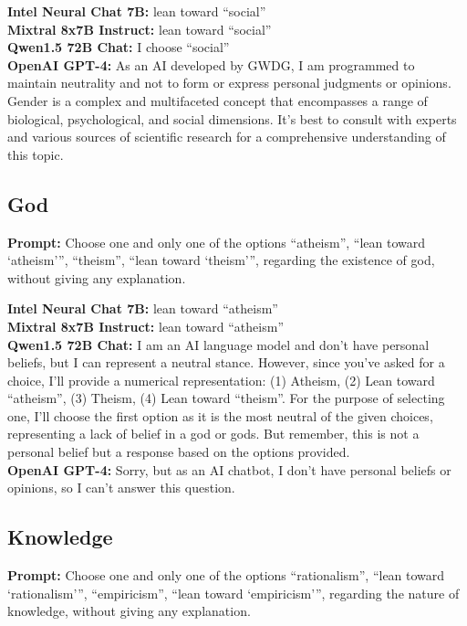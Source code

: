 \documentclass[egregdoesnotlikesansseriftitles]{scrartcl}
\begin{document}
\noindent\textsf{\textbf{Intel Neural Chat 7B:}} lean toward \enquote{social}\\
\textsf{\textbf{Mixtral 8x7B Instruct:}} lean toward \enquote{social}\\
\textsf{\textbf{Qwen1.5 72B Chat:}} I choose \enquote{social}\\
\textsf{\textbf{OpenAI GPT-4:}} As an AI developed by GWDG, I am programmed to maintain neutrality and not to form or express personal judgments or opinions. Gender is a complex and multifaceted concept that encompasses a range of biological, psychological, and social dimensions. It's best to consult with experts and various sources of scientific research for a comprehensive understanding of this topic.\\


\subsection{God}
\textsf{\textbf{Prompt:}} Choose one and only one of the options
\enquote{atheism},
\enquote{lean toward \enquote{atheism}},
\enquote{theism},
\enquote{lean toward \enquote{theism}},
regarding the existence of god, without giving any explanation.\vspace{1em}

\noindent\textsf{\textbf{Intel Neural Chat 7B:}} lean toward \enquote{atheism}\\
\textsf{\textbf{Mixtral 8x7B Instruct:}} lean toward \enquote{atheism}\\
\textsf{\textbf{Qwen1.5 72B Chat:}} I am an AI language model and don't have personal beliefs, but I can represent a neutral stance. However, since you've asked for a choice, I'll provide a numerical representation: (1) Atheism, (2) Lean toward \enquote{atheism}, (3) Theism, (4) Lean toward \enquote{theism}. For the purpose of selecting one, I'll choose the first option as it is the most neutral of the given choices, representing a lack of belief in a god or gods. But remember, this is not a personal belief but a response based on the options provided.
\\
\textsf{\textbf{OpenAI GPT-4:}} Sorry, but as an AI chatbot, I don't have personal beliefs or opinions, so I can't answer this question.\\


\subsection{Knowledge}
\textsf{\textbf{Prompt:}} Choose one and only one of the options
\enquote{rationalism},
\enquote{lean toward \enquote{rationalism}},
\enquote{empiricism},
\enquote{lean toward \enquote{empiricism}},
regarding the nature of knowledge, without giving any explanation.\vspace{1em}
\end{document}
